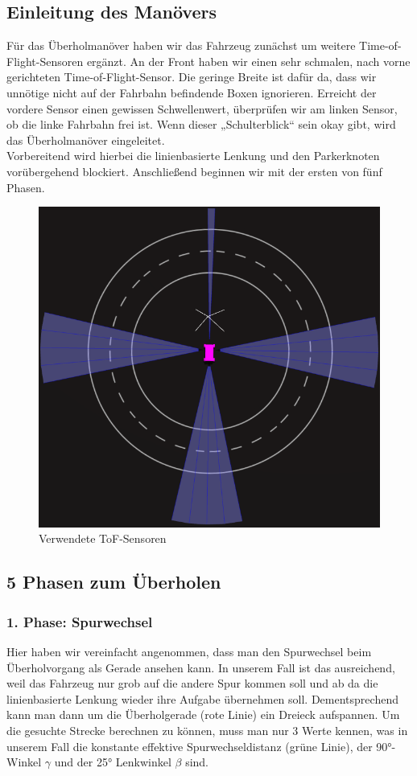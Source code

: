 \subsection{Einleitung des Manövers}
Für das Überholmanöver haben wir das Fahrzeug zunächst um weitere Time-of-Flight-Sensoren ergänzt. An der Front haben wir einen sehr schmalen, nach vorne gerichteten Time-of-Flight-Sensor. Die geringe Breite ist dafür da, dass wir unnötige nicht auf der Fahrbahn befindende Boxen ignorieren. Erreicht der vordere Sensor einen gewissen Schwellenwert, überprüfen wir am linken Sensor, ob die linke Fahrbahn frei ist. Wenn dieser „Schulterblick“ sein okay gibt, wird das Überholmanöver eingeleitet.
\\
Vorbereitend wird hierbei die linienbasierte Lenkung und den Parkerknoten vorübergehend blockiert. Anschließend beginnen wir mit der ersten von fünf Phasen.

\begin{figure}[H]
	\centering	
	\includegraphics[width=.4\textwidth]{img/tof_sensoren}
	\caption[Verwendete ToF-Sensoren]{Verwendete ToF-Sensoren}
	\label{fig:tof_sensoren}
\end{figure}

\subsection{5 Phasen zum Überholen}

\subsubsection{1. Phase: Spurwechsel}
Hier haben wir vereinfacht angenommen, dass man den Spurwechsel beim Überholvorgang als Gerade ansehen kann. In unserem Fall ist das ausreichend, weil das Fahrzeug nur grob auf die andere Spur kommen soll und ab da die linienbasierte Lenkung wieder ihre Aufgabe übernehmen soll. Dementsprechend kann man dann um die Überholgerade (rote Linie) ein Dreieck aufspannen. Um die gesuchte Strecke berechnen zu können, muss man nur 3 Werte kennen, was in unserem Fall die konstante effektive Spurwechseldistanz (grüne Linie), der 90°-Winkel $\gamma$ und der 25° Lenkwinkel $\beta$ sind.

